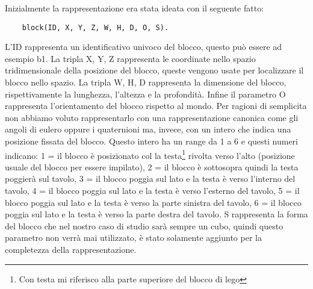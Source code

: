 Inizialmente la rappresentazione era stata ideata con il seguente fatto:
\begin{verbatim}
    block(ID, X, Y, Z, W, H, D, O, S).
\end{verbatim}
L'ID rappresenta un identificativo univoco del blocco, questo può essere ad esempio b1. La tripla X, Y, Z rappresenta le coordinate nello spazio tridimensionale della posizione del blocco, queste vengono usate per localizzare il blocco nello spazio. La tripla W, H, D rappresenta la dimensione del blocco, rispettivamente la lunghezza, l'altezza e la profondità. Infine il parametro O
rappresenta l'orientamento del blocco rispetto al mondo. Per ragioni di semplicita non abbiamo voluto rappresentarlo con una rappresentazione canonica come gli angoli di eulero oppure i quaternioni ma, invece, con un intero che indica una posizione fissata del blocco. Questo intero ha un range da 1 a 6 e questi numeri indicano: 1 = il blocco è posizionato col la testa\footnote{Con testa mi riferisco alla parte superiore del blocco di lego} rivolta verso l'alto (posizione usuale del blocco per essere impilato), 2 = il blocco è sottosopra quindi la testa poggierà sul tavolo, 3 = il blocco poggia sul lato e la testa è verso l'interno del tavolo, 4 = il blocco poggia sul lato e la testa è verso l'esterno del tavolo, 5 = il blocco poggia sul lato e la testa è verso la parte sinistra del tavolo, 6 = il blocco poggia sul lato e la testa è verso la parte destra del tavolo.
S rappresenta la forma del blocco che nel nostro caso di studio sarà sempre un cubo, quindi questo parametro non verrà mai utilizzato, è stato solamente aggiunto per la completezza della rappresentazione.

